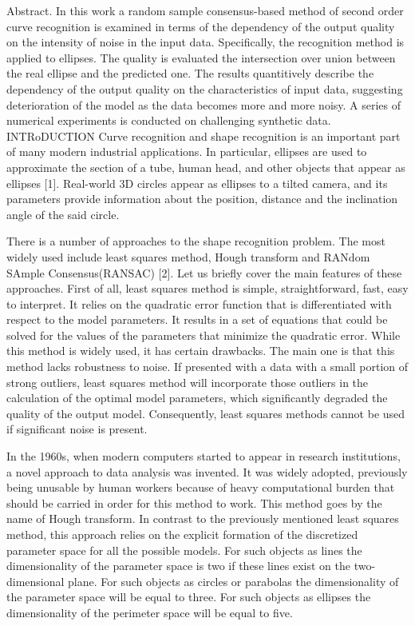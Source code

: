 
Abstract. In this work a random sample consensus-based method of second order curve recognition is examined in terms of the dependency of the output quality on the intensity of noise in the input data. Specifically, the recognition method is applied to ellipses. The quality is evaluated the intersection over union between the real ellipse and the predicted one. The results quantitively describe the dependency of the output quality on the characteristics of input data, suggesting deterioration of the model as the data becomes more and more noisy. A series of numerical experiments is conducted on challenging synthetic data.
INTRoDUCTION
Curve recognition and shape recognition is an important part of many modern industrial applications. In particular, ellipses are used to approximate the section of a tube, human head, and other objects that appear as ellipses [1]. Real-world 3D circles appear as ellipses to a tilted camera, and its parameters provide information about the position, distance and the inclination angle of the said circle.

There is a number of approaches to the shape recognition problem. The most widely used include least squares method, Hough transform and RANdom SAmple Consensus(RANSAC) [2]. Let us briefly cover the main features of these approaches. First of all, least squares method is simple, straightforward, fast, easy to interpret. It relies on the quadratic error function that is differentiated with respect to the model parameters. It results in a set of equations that could be solved for the values of the parameters that minimize the quadratic error. While this method is widely used, it has certain drawbacks. The main one is that this method lacks robustness to noise. If presented with a data with a small portion of strong outliers, least squares method will incorporate those outliers in the calculation of the optimal model parameters, which significantly degraded the quality of the output model. Consequently, least squares methods cannot be used if significant noise is present.

In the 1960s, when modern computers started to appear in research institutions, a novel approach to data analysis was invented. It was widely adopted, previously being unusable by human workers because of heavy computational burden that should be carried in order for this method to work. This method goes by the name of Hough transform. In contrast to the previously mentioned least squares method, this approach relies on the explicit formation of the discretized parameter space for all the possible models. For such objects as lines the dimensionality of the parameter space is two if these lines exist on the two-dimensional plane. For such objects as circles or parabolas the dimensionality of the parameter space will be equal to three. For such objects as ellipses the dimensionality of the perimeter space will be equal to five.

